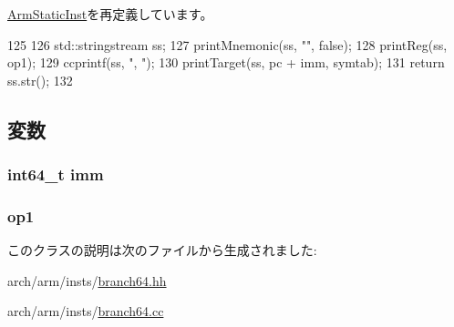 \hyperlink{classArmISA_1_1ArmStaticInst_a95d323a22a5f07e14d6b4c9385a91896}{ArmStaticInst}を再定義しています。


\begin{DoxyCode}
125 {
126     std::stringstream ss;
127     printMnemonic(ss, "", false);
128     printReg(ss, op1);
129     ccprintf(ss, ", ");
130     printTarget(ss, pc + imm, symtab);
131     return ss.str();
132 }
\end{DoxyCode}


\subsection{変数}
\hypertarget{classArmISA_1_1BranchImmReg64_a11b34c3ceec32cc1f14d0ca9c099c470}{
\subsubsection[{imm}]{\setlength{\rightskip}{0pt plus 5cm}int64\_\-t {\bf imm}}}
\label{classArmISA_1_1BranchImmReg64_a11b34c3ceec32cc1f14d0ca9c099c470}
\hypertarget{classArmISA_1_1BranchImmReg64_a4c465c43ad568f8bcf8ae71480e9cfea}{
\subsubsection[{op1}]{ {\bf op1}}}
\label{classArmISA_1_1BranchImmReg64_a4c465c43ad568f8bcf8ae71480e9cfea}


このクラスの説明は次のファイルから生成されました:\begin{DoxyCompactItemize}
\item 
arch/arm/insts/\hyperlink{branch64_8hh}{branch64.hh}\item 
arch/arm/insts/\hyperlink{branch64_8cc}{branch64.cc}\end{DoxyCompactItemize}
